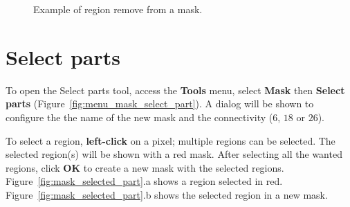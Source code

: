 \begin{figure}[!htb]
  \centering
    \qquad
  \hfill
  \caption{Example of region remove from a mask.}
  \label{fig:mask_removed_part}
\end{figure}

\section{Select parts}

To open the Select parts tool, access the \textbf{Tools} menu, select \textbf{Mask} then \textbf{Select parts} (Figure~\ref{fig:menu_mask_select_part}). A dialog will be shown to configure the the name of the new mask and the connectivity ($6$, $18$ or $26$).

To select a region, \textbf{left-click} on a pixel; multiple regions can be selected. The selected region(s) will be shown with a red mask. After selecting all the wanted regions, click \textbf{OK} to create a new mask with the selected regions. Figure~\ref{fig:mask_selected_part}.a shows a region selected in red. Figure~\ref{fig:mask_selected_part}.b shows the selected region in a new mask.

